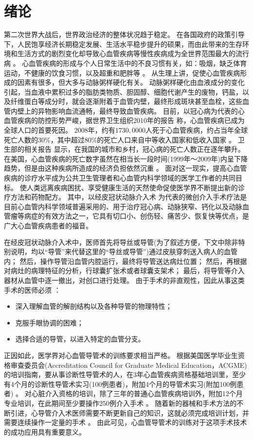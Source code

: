 \chapter{绪\;\;\;论}
\label{chap1}

第二次世界大战后，世界政治经济的整体状况趋于稳定。
在各国政府的政策引导下，人民饱享经济长期稳定发展、生活水平稳步提升的硕果，而由此带来的生存环境和生活方式的剧烈变化却导致心血管疾病等慢性疾病成为全世界范围最大的流行病 \cite{Hu2009}。%
心血管疾病的形成与个人日常生活中的不良习惯有关，如：吸烟，缺乏体育运动，不健康的饮食习惯，以及超重和肥胖等 \cite{Go2013}。
从生理上讲，促使心血管疾病形成的因素有很多，但大多与动脉粥样硬化有关。
动脉粥样硬化由血液成分的变化引起，当血液中累积过多的脂肪类物质、胆固醇、细胞代谢产生的废物，钙盐，以及纤维蛋白等成分时，就会逐渐附着于血管内壁，最终形成斑块甚至血栓，这些血管内壁上的异物影响血流通畅，最终导致血管疾病\cite{cvdaha}。
目前，以冠心病为代表的心血管疾病的防控形势严峻，据世界卫生组织2010年的报告 \cite{mho2011}称，心血管疾病已成为全球人口的首要死因。
2008年，约有$1730,0000$人死于心血管疾病，约占当年全球死亡人数的30\%，其中超过80\%的死亡人口来自中等收入国家和低收入国家 \cite{mho2011}。
卫生部的相关报告 \cite{moh2010annual,moh2007annual,moh2004annual}显示，在我国的城市和乡村，冠心病的死亡人数正在逐年攀升。
在美国，心血管疾病的死亡数字虽然在相当长一段时间(1999年～2009年)内呈下降趋势，但是由这种疾病所造成的经济负担依然沉重 \cite{Go2013}。
面对这一现实，提高心血管疾病的诊疗水平成为公共卫生管理者和心血管内科学领域的医学工作者的共同目标。
使人类远离疾病困扰、享受健康生活的天然使命促使医学界不断提出新的诊疗方法和药物配方。
其中，以经皮冠状动脉介入术 \cite{Baim2005}为代表的微创介入手术疗法是目前心血管内科学领域普遍采用的、用于治疗冠心病、动脉狭窄、钙化以及动脉血管瘤等病症的有效方法之一，它具有切口小、创伤轻、痛苦少、恢复快等优点，是广大心血管疾病患者的福音。%

在经皮冠状动脉介入术中，医师首先将导丝或导管(为了叙述方便，下文中除非特别说明，均以“导管”来代替这里的“导丝或导管”)通过皮肤穿刺送入病人的血管内；
然后，操作导管沿血管内腔运行，最终将导管送达病灶位置；
然后，再根据对病灶的病理特征的分析，行球囊扩张术或者球囊支架术；
最后，将导管等介入器材从血管中逐一撤出，对创口进行处理。
由于手术的非直观性，因此从事这类手术的医师必须 \cite{Li2012CUHK}：
\begin{itemize}
\item 深入理解血管的解剖结构以及各种导管的物理特性；
\item 克服手眼协调的困难；
\item 选择合适的导管，以进入特定的血管分支。
\end{itemize}
正因如此，医学界对心血管导管术的训练要求相当严格。
根据美国医学毕业生资格审查委员会(Accreditation Council for Graduate Medical Education，ACGME)的培训指南，要从事诊断性导管术的人，在3年心血管疾病资格基础培训里，至少有4个月的诊断性导管术实习(100例患者)，附加4个月的导管术实习(附加100例患者) \cite{Beller2002CardTraining}。%
对心脏介入资格的培训，除了三年的普通心血管疾病培训外，附加12个月专业培训，在此期间至少要操作250例介入手术 \cite{Beller2002CardTraining,Hirshfeld1999CardTraining}。
随着新的器械和手术方法的不断引进，心导管介入术医师需要不断更新自己的知识，这就必须完成培训计划，并需要连续操作一定量的手术 \cite{Baim2005}。
由此可见，心血管导管术的训练对于这项手术技术的成功应用具有重要意义。

